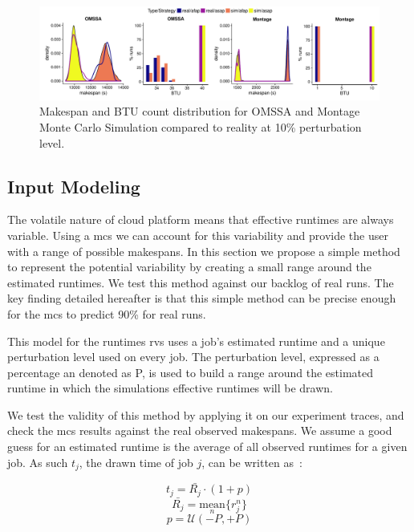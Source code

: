 \documentclass[10pt,conference,compsocconf]{IEEEtran}
\begin{document}
\begin{figure}
	\includegraphics[width=\textwidth]{gfx/fit_plot.pdf}
	\caption{Makespan and BTU count distribution for OMSSA and Montage Monte
	Carlo Simulation compared to reality at 10\% perturbation
	level.}\label{fig:fit}
\end{figure}



\subsection{Input Modeling}\label{sec:im}

The volatile nature of cloud platform means that effective runtimes are always
variable. Using a \ac{mcs} we can account for this variability and provide the
user with a range of possible makespans. In this section we propose a simple
method to represent the potential variability by creating a small range around
the estimated runtimes. We test this method against our backlog of real runs.
The key finding detailed hereafter is that this simple method can be precise
enough for the \ac{mcs} to predict 90\% for real runs.

This model for the runtimes \acp{rv} uses a job's estimated runtime and a unique
perturbation level used on every job. The perturbation level, expressed as a
percentage an denoted as P, is used to build a range around the estimated
runtime in which the simulations effective runtimes will be drawn. 

We test the validity of this method by applying it on our experiment traces, and
check the \ac{mcs} results against the real observed makespans. We assume a good
guess for an estimated runtime is the average of all observed runtimes for a
given job. As such $t_j$, the drawn time of job $j$, can be written as~:

\begin{equation}
	t_j = \bar{R_j} \cdot (1 + p)
	\label{eq:t}
\end{equation}
\begin{equation}
	\bar{R_j} = \underset{n}{\textrm{mean}}\{r_j^n\}
\end{equation}
\begin{equation}
	p = \mathcal{U}(-P,+P)
	\label{eq:r}
\end{equation}
\end{document}
